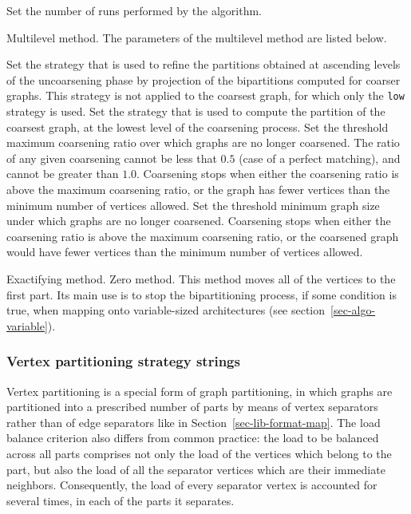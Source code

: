 \begin{itemize}
\begin{itemize}
\iteme[{\tt pass=}{\it nbr}]
Set the number of runs performed by the algorithm.
\end{itemize}
\iteme[{\tt m}]
Multilevel method. The parameters of the multilevel method are listed below.
\begin{itemize}
\iteme[{\tt asc=}{\it strat}]
Set the strategy that is used to refine the partitions obtained
at ascending levels of the uncoarsening phase by projection of the
bipartitions computed for coarser graphs.
This strategy is not applied to the coarsest graph, for which only the
{\tt low} strategy is used.
\iteme[{\tt low=}{\it strat}]
Set the strategy that is used to compute the partition of the
coarsest graph, at the lowest level of the coarsening process.
\iteme[{\tt rat=}{\it rat}]
Set the threshold maximum coarsening ratio over which graphs are no longer
coarsened. The ratio of any given coarsening cannot be less that $0.5$
(case of a perfect matching), and cannot be greater than $1.0$.
Coarsening stops when either the coarsening ratio is above the maximum
coarsening ratio, or the graph has fewer vertices than the minimum number of
vertices allowed.
\iteme[{\tt vert=}{\it nbr}]
Set the threshold minimum graph size under which graphs are no longer
coarsened. Coarsening stops when either the coarsening ratio is above the
maximum coarsening ratio, or the coarsened graph would have fewer
vertices than the minimum number of vertices allowed.
\end{itemize}
\iteme[{\tt x}]
Exactifying method.
\iteme[{\tt z}]
Zero method. This method moves all of the vertices to the first
part. Its main use is to stop the bipartitioning process, if some
condition is true, when mapping onto variable-sized architectures (see
section~\ref{sec-algo-variable}).
\end{itemize}

\subsubsection{Vertex partitioning strategy strings}
\label{sec-lib-format-part-ovl}

Vertex partitioning is a special form of graph partitioning, in which
graphs are partitioned into a prescribed number of parts by means of
vertex separators rather than of edge separators like in
Section~\ref{sec-lib-format-map}. The load balance criterion also
differs from common practice: the load to be balanced across all parts
comprises not only the load of the vertices which belong to the part,
but also the load of all the separator vertices which are their
immediate neighbors. Consequently, the load of every separator vertex
is accounted for several times, in each of the parts it separates.


